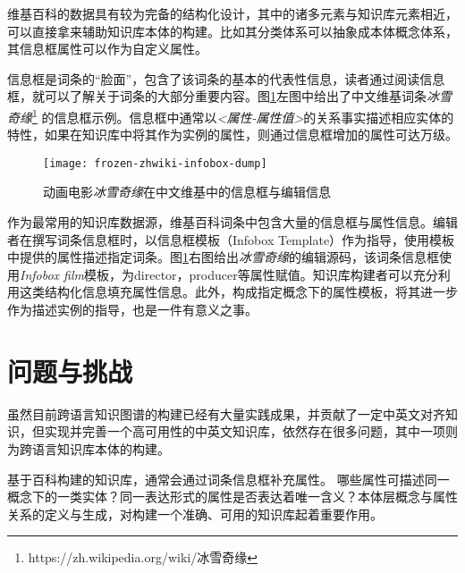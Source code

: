 
维基百科的数据具有较为完备的结构化设计，其中的诸多元素与知识库元素相近，可以直接拿来辅助知识库本体的构建。比如其分类体系可以抽象成本体概念体系，其信息框属性可以作为自定义属性。

信息框是词条的“脸面”，包含了该词条的基本的代表性信息，读者通过阅读信息框，就可以了解关于词条的大部分重要内容。图\ref{fig:frozen-zhwiki-infobox-dump}左图中给出了中文维基词条\textit{冰雪奇缘}\footnote{https://zh.wikipedia.org/wiki/冰雪奇缘} 的信息框示例。信息框中通常以\textit{<属性-属性值>}的关系事实描述相应实体的特性，如果在知识库中将其作为实例的属性，则通过信息框增加的属性可达万级。

\begin{figure}[h]
  \centering
  \texttt{[image: frozen-zhwiki-infobox-dump]}
  \caption{动画电影\textit{冰雪奇缘}在中文维基中的信息框与编辑信息}
  \label{fig:frozen-zhwiki-infobox-dump}
\end{figure}

作为最常用的知识库数据源，维基百科词条中包含大量的信息框与属性信息。编辑者在撰写词条信息框时，以信息框模板（Infobox Template）作为指导，使用模板中提供的属性描述指定词条。图\ref{fig:frozen-zhwiki-infobox-dump}右图给出\textit{冰雪奇缘}的编辑源码，该词条信息框使用\textit{Infobox film}模板，为director，producer等属性赋值。知识库构建者可以充分利用这类结构化信息填充属性信息。此外，构成指定概念下的属性模板，将其进一步作为描述实例的指导，也是一件有意义之事。

\section{问题与挑战}

虽然目前跨语言知识图谱的构建已经有大量实践成果，并贡献了一定中英文对齐知识，但实现并完善一个高可用性的中英文知识库，依然存在很多问题，其中一项则为跨语言知识库本体的构建。

基于百科构建的知识库，通常会通过词条信息框补充属性。
哪些属性可描述同一概念下的一类实体？同一表达形式的属性是否表达着唯一含义？本体层概念与属性关系的定义与生成，对构建一个准确、可用的知识库起着重要作用。

